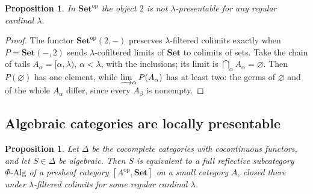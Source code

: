 \documentclass[11pt,a4paper]{amsart}
\newtheorem{proposition}[theorem]{Proposition}
\theoremstyle{definition}
\theoremstyle{remark}
\newcommand{\Set}{\mathbf{Set}}
\begin{document}
\begin{proposition}\label{p:pres}
In $\Set^{\mathrm{op}}$ the object $2$ is not $\lambda$-presentable for any regular cardinal $\lambda$.
\end{proposition}

\begin{proof}
The functor $\Set^{\mathrm{op}}(2,-)$ preserves $\lambda$-filtered colimits exactly when $P=\Set(-,2)$ sends $\lambda$-cofiltered limits of $\Set$ to colimits of sets. Take the chain of tails $A_\alpha=[\alpha,\lambda)$, $\alpha<\lambda$, with the inclusions; its limit is $\bigcap_\alpha A_\alpha=\varnothing$. Then $P(\varnothing)$ has one element, while $\varinjlim_\alpha P(A_\alpha)$ has at least two: the germs of $\varnothing$ and of the whole $A_\alpha$ differ, since every $A_\beta$ is nonempty.
\end{proof}

\subsection{Algebraic categories are locally presentable}

\begin{proposition}\label{p:sketch}
Let $\Delta$ be the cocomplete categories with cocontinuous functors, and let $S\in\Delta$ be algebraic. Then $S$ is equivalent to a full reflective subcategory $\Phi\text{-}\mathrm{Alg}$ of a presheaf category $[A^{\mathrm{op}},\Set]$ on a small category $A$, closed there under $\lambda$-filtered colimits for some regular cardinal $\lambda$.
\end{proposition}
\end{document}
